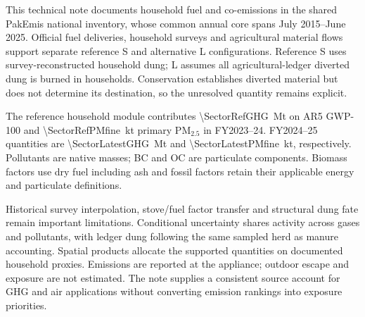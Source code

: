 This technical note documents household fuel and co-emissions in the shared PakEmis national inventory, whose common annual core spans July 2015--June 2025. Official fuel deliveries, household surveys and agricultural material flows support separate reference S and alternative L configurations. Reference S uses survey-reconstructed household dung; L assumes all agricultural-ledger diverted dung is burned in households. Conservation establishes diverted material but does not determine its destination, so the unresolved quantity remains explicit.

The reference household module contributes \SI{\SectorRefGHG}{\mega\tonne} \COe{} on AR5 GWP-100 and \SI{\SectorRefPMfine}{\kilo\tonne} primary PM$_{2.5}$ in FY2023--24. FY2024--25 quantities are \SI{\SectorLatestGHG}{\mega\tonne} and \SI{\SectorLatestPMfine}{\kilo\tonne}, respectively. Pollutants are native masses; BC and OC are particulate components. Biomass factors use dry fuel including ash and fossil factors retain their applicable energy and particulate definitions.

Historical survey interpolation, stove/fuel factor transfer and structural dung fate remain important limitations. Conditional uncertainty shares activity across gases and pollutants, with ledger dung following the same sampled herd as manure accounting. Spatial products allocate the supported quantities on documented household proxies. Emissions are reported at the appliance; outdoor escape and exposure are not estimated. The note supplies a consistent source account for GHG and air applications without converting emission rankings into exposure priorities.

